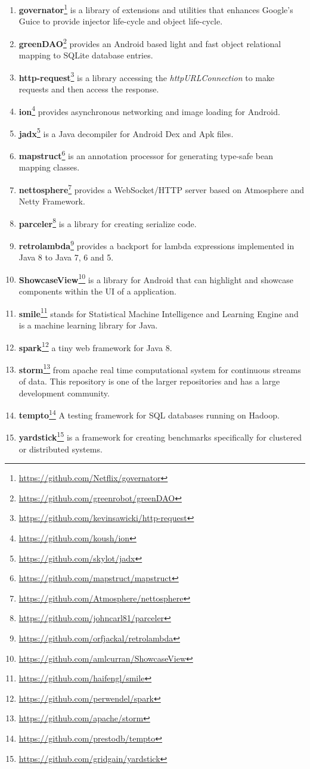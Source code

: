 \begin{enumerate}
\item \textbf{governator}\footnote{\url{https://github.com/Netflix/governator}} is a library of extensions and utilities that enhances Google's Guice to provide injector life-cycle and object life-cycle.
\item \textbf{greenDAO}\footnote{\url{https://github.com/greenrobot/greenDAO}} provides an Android based light and fast object relational mapping to SQLite database entries.
\item \textbf{http-request}\footnote{\url{https://github.com/kevinsawicki/http-request}} is a library accessing the \textit{httpURLConnection} to make requests and then access the response.
\item \textbf{ion}\footnote{\url{https://github.com/koush/ion}} provides asynchronous networking and image loading for Android.
\item \textbf{jadx}\footnote{\url{https://github.com/skylot/jadx}} is a Java decompiler for Android Dex and Apk files.
\item \textbf{mapstruct}\footnote{\url{https://github.com/mapstruct/mapstruct}} is an annotation processor for generating type-safe bean mapping classes.
\item \textbf{nettosphere}\footnote{\url{https://github.com/Atmosphere/nettosphere}} provides a WebSocket/HTTP server based on Atmosphere and Netty Framework.
\item \textbf{parceler}\footnote{\url{https://github.com/johncarl81/parceler}} is a library for creating serialize code.
\item \textbf{retrolambda}\footnote{\url{https://github.com/orfjackal/retrolambda}} provides a backport for lambda expressions implemented in Java 8 to Java 7, 6 and 5. 
\item \textbf{ShowcaseView}\footnote{\url{https://github.com/amlcurran/ShowcaseView}} is a library for Android that can highlight and showcase components within the UI of a application.
\item \textbf{smile}\footnote{\url{https://github.com/haifengl/smile}} stands for Statistical Machine Intelligence and Learning Engine and is a machine learning library for Java.
\item \textbf{spark}\footnote{\url{https://github.com/perwendel/spark}} a tiny web framework for Java 8.
\item \textbf{storm}\footnote{\url{https://github.com/apache/storm}} from apache real time computational system for continuous streams of data. This repository is one of the larger repositories and has a large development community.
\item \textbf{tempto}\footnote{\url{https://github.com/prestodb/tempto}} A testing framework for SQL databases running on Hadoop.
\item \textbf{yardstick}\footnote{\url{https://github.com/gridgain/yardstick}} is a framework for creating benchmarks specifically for clustered or distributed systems.

\end{enumerate}

